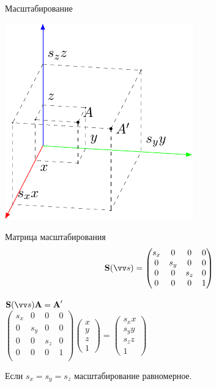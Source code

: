 \documentclass[10pt]{beamer}
\begin{document}
	
	\begin{frame}{Масштабирование}
		
		{
			\includegraphics{scale.pdf}
		}
		{
			\begin{block}{Матрица масштабирования}
				$$
				\textbf{S}(\vv s) =
				\begin{pmatrix}
					s_x & 0 & 0 & 0\\
					0 & s_y & 0 & 0\\
					0 & 0 & s_z & 0\\
					0 & 0 & 0 & 1\\
				\end{pmatrix}
				$$
			\end{block}
			
			$\textbf{S}(\vv s)\textbf{A}=\textbf{A}'$ \\[0.5em]
			$
			\begin{pmatrix}
				s_x & 0 & 0 & 0\\
				0 & s_y & 0 & 0\\
				0 & 0 & s_z & 0\\
				0 & 0 & 0 & 1\\
			\end{pmatrix}
			\begin{pmatrix}
				x\\
				y\\
				z\\
				1
			\end{pmatrix}
			=
			\begin{pmatrix}
				s_xx\\
				s_yy\\
				s_zz\\
				1
			\end{pmatrix}			
			$
			
		Если $s_x=s_y=s_z$ масштабирование равномерное.
		}
		
	\end{frame}
	
\end{document}
